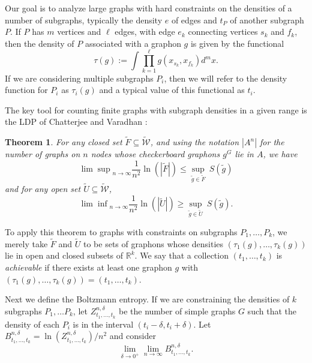 \documentclass[12pt]{amsart}
\newcommand{\tdens}{\tau}
\newcommand{\R}{\mathbb{R}}
\newcommand{\1}{\mathbf{1}}
\newcommand{\www}{{\mathcal W}}
\newtheorem{theorem}[lemma]{Theorem}
\begin{document}
Our  goal is to analyze large graphs with hard constraints on the
densities of a number of subgraphs, typically the density $e$ of edges and 
$t_P$ of another subgraph $P$. If $P$ has $m$ vertices and $\ell$ edges, with 
edge $e_k$ connecting vertices $s_k$ and $f_k$, then the density of $P$ associated
with a graphon $g$ is given by the functional
\begin{equation}
\tdens(g) := \int \prod_{k=1}^\ell g(x_{s_k},x_{f_k}) d^mx. 
\end{equation}
If we are considering multiple subgraphs $P_i$, then we will refer to the 
density function for $P_i$ as $\tdens_i(g)$ and a typical value of this functional
as $t_i$. 

The key tool for counting finite graphs with subgraph densities in a given range is 
the LDP of Chatterjee and Varadhan \cite{CV}:
\begin{theorem}\label{thmCV} For any closed set $\tilde{F}
  \subseteq \widetilde{\www}$, and using the notation $|A^n|$ for the
  number of graphs on $n$ nodes whose checkerboard graphons $g^G$
lie in $A$, we have
  \begin{equation}{\lim \sup}_{n\to \infty} \frac{1}{n^2}
    \ln(|\tilde{F}|)\le {\sup}_{\tilde{g} \in \tilde{F}} \ S(\tilde{g})
\end{equation}
and for any open set $\tilde{U}\subseteq \widetilde{\www}$,
\begin{equation}
  {\lim \inf}_{n\to \infty} \frac{1}{n^2}\ln(|\tilde{U}|)\ge
  {\sup}_{\tilde{g}\in \tilde{U}} \ S(\tilde{g}).
 \end{equation} 
  \end{theorem}
To apply this theorem to graphs with constraints on subgraphs $P_1, \ldots, P_k$, 
we merely take $\tilde F$ and $\tilde U$ to be sets of graphons whose densities 
$(\tdens_1(g), \ldots, \tdens_k(g))$ lie in open and closed subsets of $\R^k$. 
We say that a collection $(t_1,\ldots,t_k)$ is {\em achievable} if there exists at least
one graphon $g$ with $(\tdens_1(g),\ldots,\tdens_k(g)) = (t_1,\ldots,t_k)$.


Next we define the Boltzmann entropy. If we are constraining the densities of 
$k$ subgraphs $P_1, \ldots P_k$, let $\displaystyle Z^{n,\delta}_{t_1,\ldots,t_k}$ 
be the number of simple graphs $G$
such that the density of each $P_i$ is in the interval $(t_i-\delta,t_i+\delta)$.
Let $\displaystyle B^{n,\delta}_{t_1,\ldots,t_k}={\ln(Z^{n,\delta}_{t_1,\ldots,t_k})}/{n^2}$ and
consider
\begin{equation}\label{Blimit}
  \lim_{\delta\to 0^+}\lim_{n\to \infty}B^{n,\delta}_{t_1,\ldots,t_k}.
  \end{equation}
\end{document}
